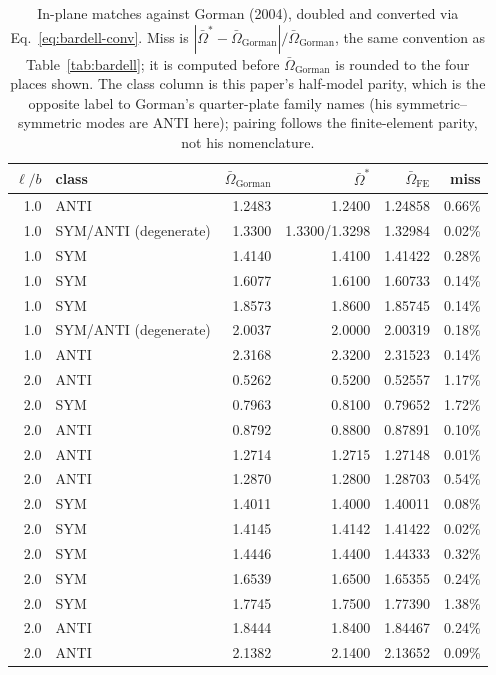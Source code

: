 \documentclass[11pt]{article}
\begin{document}
\begin{table}[!htbp]
\centering\footnotesize
\caption{In-plane matches against Gorman (2004), doubled and converted via
Eq.~\eqref{eq:bardell-conv}. Miss is
$|\bar\Omega^{*}-\bar\Omega_{\text{Gorman}}|/\bar\Omega_{\text{Gorman}}$,
the same convention as Table~\ref{tab:bardell}; it is computed before
$\bar\Omega_{\text{Gorman}}$ is rounded to the four places shown. The class
column is this paper's half-model parity, which is the opposite label to
Gorman's quarter-plate family names (his symmetric--symmetric modes are ANTI
here); pairing follows the finite-element parity, not his
nomenclature.}\label{tab:gorman}
\setlength{\tabcolsep}{4pt}
\begin{tabular}{@{}rlrrrr@{}}
\toprule
$\ell/b$ & class & $\bar\Omega_{\text{Gorman}}$ & $\bar\Omega^{*}$ & $\bar\Omega_{\mathrm{FE}}$ & miss \\
\midrule
1.0 & ANTI & 1.2483 & 1.2400 & 1.24858 & 0.66\% \\
1.0 & SYM/ANTI (degenerate) & 1.3300 & 1.3300/1.3298 & 1.32984 & 0.02\% \\
1.0 & SYM  & 1.4140 & 1.4100 & 1.41422 & 0.28\% \\
1.0 & SYM  & 1.6077 & 1.6100 & 1.60733 & 0.14\% \\
1.0 & SYM  & 1.8573 & 1.8600 & 1.85745 & 0.14\% \\
1.0 & SYM/ANTI (degenerate) & 2.0037 & 2.0000 & 2.00319 & 0.18\% \\
1.0 & ANTI & 2.3168 & 2.3200 & 2.31523 & 0.14\% \\
2.0 & ANTI & 0.5262 & 0.5200 & 0.52557 & 1.17\% \\
2.0 & SYM  & 0.7963 & 0.8100 & 0.79652 & 1.72\% \\
2.0 & ANTI & 0.8792 & 0.8800 & 0.87891 & 0.10\% \\
2.0 & ANTI & 1.2714 & 1.2715 & 1.27148 & 0.01\% \\
2.0 & ANTI & 1.2870 & 1.2800 & 1.28703 & 0.54\% \\
2.0 & SYM  & 1.4011 & 1.4000 & 1.40011 & 0.08\% \\
2.0 & SYM  & 1.4145 & 1.4142 & 1.41422 & 0.02\% \\
2.0 & SYM  & 1.4446 & 1.4400 & 1.44333 & 0.32\% \\
2.0 & SYM  & 1.6539 & 1.6500 & 1.65355 & 0.24\% \\
2.0 & SYM  & 1.7745 & 1.7500 & 1.77390 & 1.38\% \\
2.0 & ANTI & 1.8444 & 1.8400 & 1.84467 & 0.24\% \\
2.0 & ANTI & 2.1382 & 2.1400 & 2.13652 & 0.09\% \\
\bottomrule
\end{tabular}
\end{table}
\end{document}

